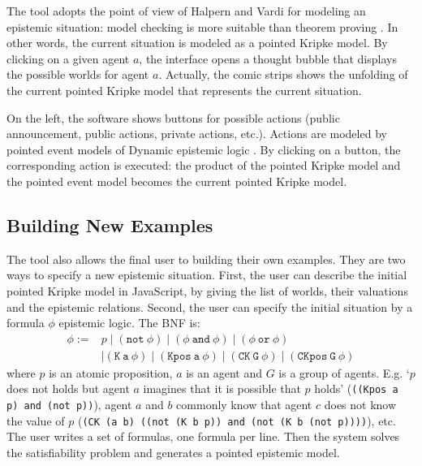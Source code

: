\documentclass{article}
\begin{document}
The tool adopts the point of view of Halpern and Vardi for modeling an epistemic situation: model checking is more suitable than theorem proving \cite{DBLP:conf/kr/HalpernV91}. In other words, the current situation is modeled as a pointed Kripke model.
By clicking on a given agent $a$, the interface opens a thought bubble that displays the possible worlds for agent $a$. Actually, the comic strips shows the unfolding of the current pointed Kripke model that represents the current situation.

On the left, the software shows buttons for possible actions (public announcement, public actions, private actions, etc.). Actions are modeled by pointed event models of Dynamic epistemic logic \cite{baltag1998logic}. By clicking on a button, the corresponding action is executed: the product of the pointed Kripke model and the pointed event model becomes the current pointed Kripke model.



\subsection{Building New Examples}

The tool also allows the final user to building their own examples. They are two ways to specify a new epistemic situation. First, the user can describe the initial pointed Kripke model in JavaScript, by giving the list of worlds, their valuations and the epistemic relations. Second, the user can specify the initial situation by a formula $\phi$ epistemic logic. The BNF is:
%
%	
$$\begin{array}{ll}\phi := & p \mid (\mathtt{not~} \phi) \mid (\phi \mathtt {~and~} \phi) \mid (\phi \mathtt {~or~} \phi)  \\ & \mid \mathtt{(K~a~\phi)} \mid \mathtt{(Kpos~a~\phi)} \mid \mathtt{(CK~G~\phi)}\mid \mathtt{(CKpos~G~\phi)}\end{array}$$
%
where $p$ is an atomic proposition, $a$ is an agent and $G$ is a group of agents. E.g. `$p$ does not holds but agent $a$ imagines that it is possible that $p$ holds' (\texttt{((Kpos a p) and (not p))}), agent $a$ and $b$ commonly know that agent $c$ does not know the value of $p$ (\texttt{(CK (a b) ((not (K b p)) and (not (K b (not p))))}), etc. The user writes a set of formulas, one formula per line.
%
%	
Then the system solves the satisfiability problem and generates a pointed epistemic model.
\end{document}
